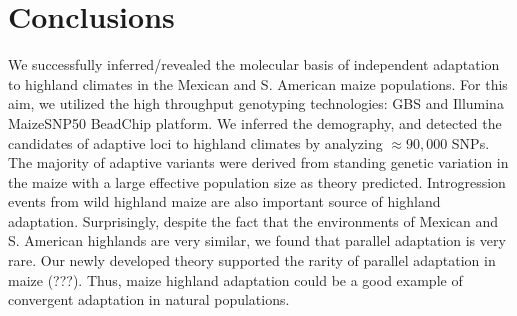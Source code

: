 \section*{Conclusions} 
We successfully inferred/revealed the molecular basis of independent adaptation to highland climates in the Mexican and S. American maize populations.
For this aim, we utilized the high throughput genotyping technologies: GBS and Illumina MaizeSNP50 BeadChip platform.
We inferred the demography, and detected the candidates of adaptive loci to highland climates by analyzing $\approx 90,000$ SNPs.
The majority of adaptive variants were derived from standing genetic variation in the maize with a large effective population size as theory predicted.
Introgression events from wild highland maize are also important source of highland adaptation.
Surprisingly, despite the fact that the environments of Mexican and S. American highlands are very similar, we found that parallel adaptation is very rare. 
Our newly developed theory supported the rarity of parallel adaptation in maize (???).
Thus, maize highland adaptation could be a good example of convergent adaptation in natural populations.




